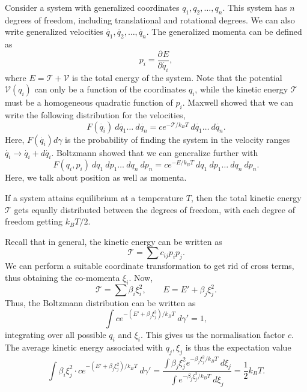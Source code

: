 \documentclass[11pt]{article}
\newcommand\pp[3][]{\frac{\partial^{#1}{#2}}{\partial {#3}^{#1}}}
\theoremstyle{definition}
\theoremstyle{remark}
\numberwithin{equation}{section}
\begin{document}
    Consider a system with generalized coordinates $q_1, q_2, \dots, q_n$. This
    system has $n$ degrees of freedom, including translational and rotational
    degrees. We can also write generalized velocities $\dot{q_1}, \dot{q_2}, \dots,
    \dot{q_n}$. The generalized momenta can be defined as \[
        p_i = \pp{E}{\dot{q_i}},
    \] where $E = \mathscr{T} + \mathscr{V}$ is the total energy of the system. Note
    that the potential $\mathscr{V}(q_i)$ can only be a function of the coordinates
    $q_i$, while the kinetic energy $\mathscr{T}$ must be a homogeneous quadratic
    function of $p_i$. Maxwell showed that we can write the following distribution
    for the velocities, \[
        F(\dot{q_i})\:d\dot{q_1}\dots\:d\dot{q_n} = c e^{-\mathscr{T} /k_B T}
        \:d\dot{q_1}\dots\:d\dot{q_n}.
    \] Here, $F(\dot{q_i})d\gamma$ is the probability of finding the system in the
    velocity ranges $\dot{q_i} \to \dot{q_i} + d\dot{q_i}$.
    Boltzmann showed that we can generalize further with  \[
        F(q_i, p_i)\:dq_1\:dp_1\dots\:dq_n\:dp_n = c e^{-E /k_B T}
        \:dq_1\:dp_1 \dots \:dq_n\:dp_n.
    \] Here, we talk about position as well as momenta.

    \begin{theorem}
        If a system attains equilibrium at a temperature $T$, then the total kinetic
        energy $\mathscr{T}$ gets equally distributed between the degrees of
        freedom, with each degree of freedom getting $k_B T / 2$.
    \end{theorem}   
    Recall that in general, the kinetic energy can be written as \[
        \mathscr{T} = \sum c_{ij}p_i p_j.
    \] We can perform a suitable coordinate transformation to get rid of cross
    terms, thus obtaining the co-momenta $\xi_i$. Now, \[
        \mathscr{T} = \sum \beta_i \xi_i^2, \qquad 
        E = E' + \beta_j\xi_j^2.
    \] Thus, the Boltzmann distribution can be written as \[
        \int ce^{-(E' + \beta_j\xi_j^2) / k_BT} \:d\gamma' = 1,
    \] integrating over all possible $q_i$ and $\xi_i$. This gives us the
    normalisation factor $c$. The average kinetic energy associated with $q_j,
    \xi_j$ is thus the expectation value \[
        \int \beta_i\xi_j^2 \cdot ce^{-(E' + \beta_j\xi_j^2) / k_BT} \:d\gamma' =
        \frac{\displaystyle\int \beta_j \xi_j^2 e^{-\beta_j\xi_j^2 / k_B T}
        \:d\xi_j}{\displaystyle\int e^{-\beta_j\xi_j^2 / k_BT}\:d\xi_j} =
        \frac{1}{2}k_BT.
    \] 
\end{document}
